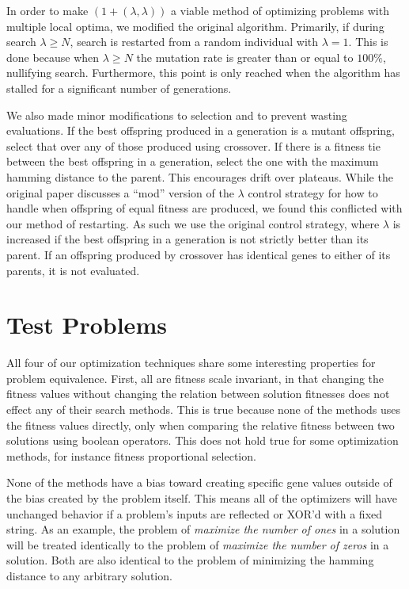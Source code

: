 \documentclass{sig-alternate}
\begin{document}
In order to make $(1+(\lambda,\lambda))$ a viable method of optimizing problems
with multiple local optima, we modified the original algorithm.  Primarily, if
during search $\lambda \ge N$, search is restarted from a random individual with
$\lambda=1$.  This is done because when $\lambda \ge N$ the mutation rate is greater
than or equal to $100\%$, nullifying search.  Furthermore, this point is only reached
when the algorithm has stalled for a significant number of generations.

We also made minor modifications to selection and to prevent wasting evaluations.
If the best offspring produced in a generation is a mutant offspring, select that
over any of those produced using crossover.  If there is a fitness tie between the
best offspring in a generation, select the one with the maximum hamming distance
to the parent.  This encourages drift over plateaus.  While the original paper
discusses a ``mod'' version of the $\lambda$ control strategy for how to handle
when offspring of equal fitness are produced, we found this conflicted with our
method of restarting.  As such we use the original control strategy, where $\lambda$
is increased if the best offspring in a generation is not strictly better than its parent.
If an offspring produced by crossover has identical genes to either of its parents,
it is not evaluated.

\section{Test Problems}
All four of our optimization techniques share some interesting properties for
problem equivalence.  First, all are fitness scale invariant, in that changing
the fitness values without changing the relation between solution fitnesses does
not effect any of their search methods.  This is true because none of the methods
uses the fitness values directly, only when comparing the relative fitness between
two solutions using boolean operators.  This does not hold true for some optimization
methods, for instance fitness proportional selection.

None of the methods have a bias toward creating specific gene values outside
of the bias created by the problem itself.  This means all of the optimizers
will have unchanged behavior if a problem's inputs are reflected or XOR'd with a fixed string.  As
an example, the problem of \emph{maximize the number of ones} in a solution will be treated identically
to the problem of \emph{maximize the number of zeros} in a solution.  Both are also identical
to the problem of minimizing the hamming distance to any arbitrary solution.
\end{document}

